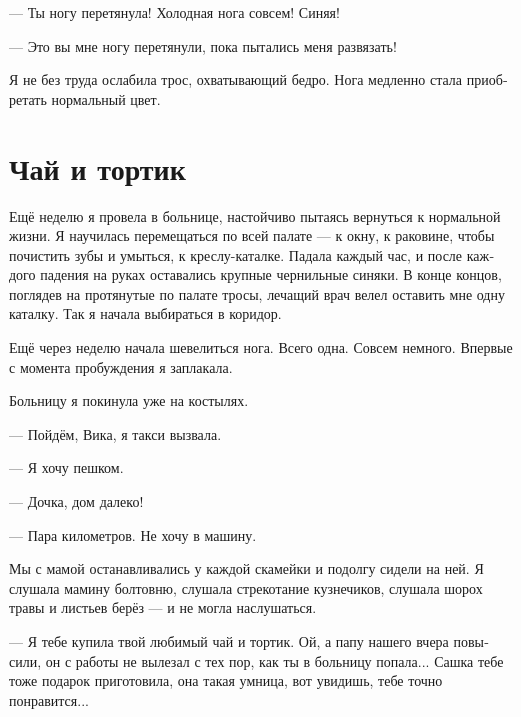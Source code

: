 \documentclass[a4paper,12pt,fleqn]{book}\usepackage{polyglossia}\setdefaultlanguage[babelshorthands=true]{russian}\setotherlanguage{english}\defaultfontfeatures{Ligatures=TeX,Mapping=tex-text}\usepackage{xcolor}\newcommand{\ml}[3]{#2}
\begin{document}
--- Ты ногу перетянула!
Холодная нога совсем!
Синяя!

--- Это вы мне ногу перетянули, пока пытались меня развязать!

Я не без труда ослабила трос, охватывающий бедро.
Нога медленно стала приобретать нормальный цвет.

\section{Чай и тортик}

Ещё неделю я провела в больнице, настойчиво пытаясь вернуться к нормальной жизни.
Я научилась перемещаться по всей палате --- к окну, к раковине, чтобы почистить зубы и умыться, к креслу-каталке.
Падала каждый час, и после каждого падения на руках оставались крупные чернильные синяки.
В конце концов, поглядев на протянутые по палате тросы, лечащий врач велел оставить мне одну каталку.
Так я начала выбираться в коридор.

Ещё через неделю начала шевелиться нога.
Всего одна.
Совсем немного.
Впервые с момента пробуждения я заплакала.

Больницу я покинула уже на костылях.

--- Пойдём, Вика, я такси вызвала.

--- Я хочу пешком.

--- Дочка, дом далеко!

--- Пара километров.
Не хочу в машину.

Мы с мамой останавливались у каждой скамейки и подолгу сидели на ней.
Я слушала мамину болтовню, слушала стрекотание кузнечиков, слушала шорох травы и листьев берёз --- и не могла наслушаться.

--- Я тебе купила твой любимый чай и тортик.
Ой, а папу нашего вчера повысили, он с работы не вылезал с тех пор, как ты в больницу попала...
Сашка тебе тоже подарок приготовила, она такая умница, вот увидишь, тебе точно понравится...
\end{document}
